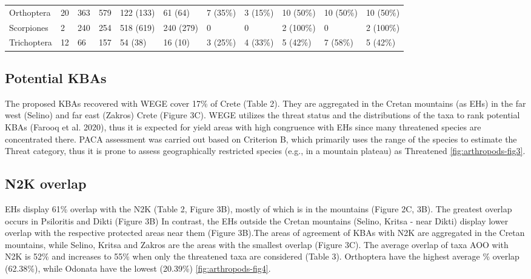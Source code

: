 \begin{sidewaystable}
\begin{tabular}{lllllllllll}
Orthoptera                   & 20   & 363   & 579         & 122 (133)         & 61 (64)                  & 7 (35\%)   & 3 (15\%)  & 10 (50\%) & 10 (50\%)  & 10 (50\%) \\
Scorpiones                   & 2    & 240   & 254         & 518 (619)         & 240 (279)                & 0          & 0         & 2 (100\%) & 0          & 2 (100\%) \\
Trichoptera                  & 12   & 66    & 157         & 54 (38)           & 16 (10)                  & 3 (25\%)   & 4 (33\%)  & 5 (42\%)  & 7 (58\%)   & 5 (42\%) 
\end{tabular}
\label{arthropods-results}
\end{sidewaystable}



\subsection{Potential KBAs}
    \label{subsec:potential-kbas}
    
The proposed KBAs recovered with WEGE cover 17\% of Crete (Table 2). They are
aggregated in the Cretan mountains (as EHs) in the far west (Selino) and far
east (Zakros) Crete (Figure 3C). WEGE utilizes the threat status and the
distributions of the taxa to rank potential KBAs (Farooq et al. 2020), thus it
is expected for yield areas with high congruence with EHs since many threatened
species are concentrated there. PACA assessment was carried out based on
Criterion B, which primarily uses the range of the species to estimate the
Threat category, thus it is prone to assess geographically restricted species
(e.g., in a mountain plateau) as Threatened \ref{fig:arthropods-fig3}.

    \subsection{N2K overlap}
    \label{subsec:n2k-overlap}

EHs display 61\% overlap with the N2K (Table 2, Figure 3B), mostly of which is
in the mountains (Figure 2C, 3B). The greatest overlap occurs in Psiloritis and
Dikti (Figure 3B) In contrast, the EHs outside the Cretan mountains
(Selino, Kritsa - near Dikti) display lower overlap with the respective
protected areas near them (Figure 3B).The areas of agreement of KBAs with N2K
are aggregated in the Cretan mountains, while Selino, Kritsa and Zakros are the
areas with the smallest overlap (Figure 3C). The average overlap of taxa AOO
with N2K is 52\% and increases to 55\% when only the threatened taxa are
considered (Table 3). Orthoptera have the highest average \% overlap (62.38\%),
while Odonata have the lowest (20.39\%) \ref{fig:arthropods-fig4}.
    

